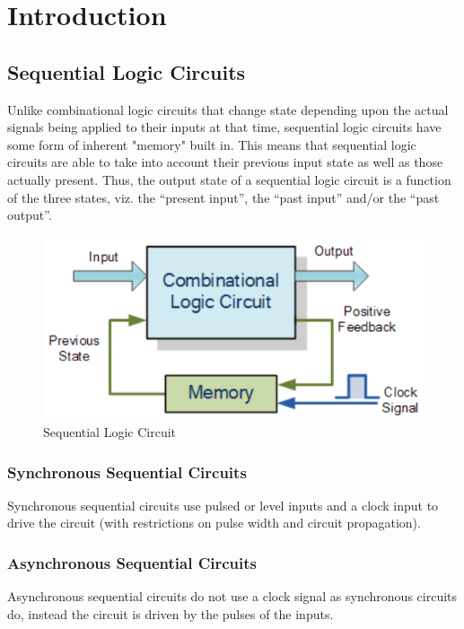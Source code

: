 \documentclass{lab_sheet}
\begin{document}
    \tableofcontents
    \pagebreak
    \listoffigures
    \pagebreak
    \lstlistoflistings
    \pagebreak
    \section{Introduction}
    \subsection{Sequential Logic Circuits}
    Unlike combinational logic circuits that change state depending upon the actual signals being applied to their inputs at that time, sequential logic circuits have some form of inherent "memory" built in. This means that sequential logic circuits are able to take into account their previous input state as well as those actually present. Thus, the output state of a sequential logic circuit is a function of the three states, viz. the “present input”, the “past input” and/or the “past output”. 
    \begin{figure}[H]
        \centering
        \includegraphics[]{../Figures/seq.png}
        \caption{Sequential Logic Circuit}
        \label{fig:seq}
    \end{figure}
    \subsubsection{Synchronous Sequential Circuits}
    Synchronous sequential circuits use pulsed or level inputs and a clock input to drive the circuit (with restrictions on pulse width and circuit propagation).
    \subsubsection{Asynchronous Sequential Circuits}
    Asynchronous sequential circuits do not use a clock signal as synchronous circuits do, instead the circuit is driven by the pulses of the inputs.
\end{document}
